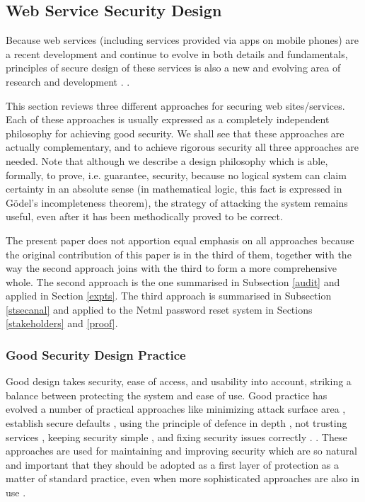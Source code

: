 \subsection{Web Service Security Design}\label{webservicessecurity}
Because web services (including services provided via apps on mobile phones)
are a recent development and continue to evolve in both details and fundamentals,
principles of secure design of these services is also a new and evolving area of
research and development \iflonger\cite{AddieColman2010,Addie_Moffatt_Dekeyser_Colman2011}.
\else\cite{Addie_Moffatt_Dekeyser_Colman2011}.\fi

This section reviews three different approaches for securing web sites/services.
Each of these approaches is usually expressed as a completely independent
philosophy for achieving good security. We shall see that these approaches 
are actually complementary, and to achieve rigorous security all three approaches
are needed. Note that although we describe a design philosophy which is able, formally, to prove,
i.e.  guarantee, security, because no logical system can claim certainty in an absolute
sense (in mathematical logic, this fact is expressed in G\"odel's incompleteness theorem), the strategy 
of attacking the system remains useful, even after it has been
methodically proved to be correct.

The present paper does not apportion equal emphasis on all approaches
because the original contribution of this paper is 
in the third of them, together with the way the second approach joins
with the third to form a more comprehensive whole. The second approach
is the one summarised in Subsection \ref{audit} and applied
in Section \ref{expts}.
The third approach is summarised in Subsection \ref{stsecanal} and applied
to the Netml password reset system in Sections \ref{stakeholders} and \ref{proof}.


\subsubsection{Good Security Design Practice}
Good design takes security, ease of access, and usability into account,
striking a balance between protecting the system and ease of use. Good
practice has evolved a number of practical approaches like  minimizing
attack surface area \cite{bhardwaj2018reducing},  establish secure
defaults \cite{lai2018impact}, using the principle of defence in depth
\cite{toch2018privacy}, not trusting services \cite{ghirardello2018cyber},
keeping security simple \cite{thomsen2018network}, and fixing security
issues correctly \iflonger\cite {ali2018security, tabassum2018evaluating}.
\else \cite {tabassum2018evaluating}.\fi
These approaches  are used for  maintaining and improving security which
are so natural and important that they should be adopted as a first
layer of protection as a matter of standard practice, even when more
sophisticated approaches are also in use \cite {ross2018systems}.


